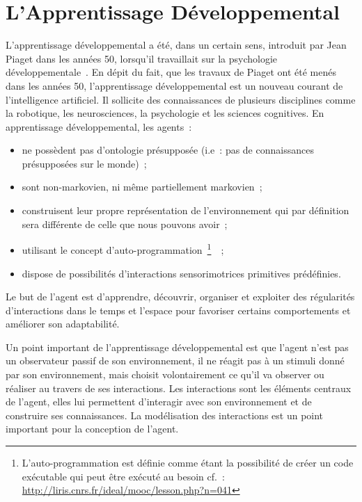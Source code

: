 \documentclass{llncs}
\begin{document}
\section{L'Apprentissage Développemental}
L'apprentissage développemental a été, dans un certain sens, introduit par Jean Piaget dans les années 50, lorsqu'il travaillait sur la psychologie développementale~\cite{cognitiviste-piaget1959construction}. En dépit du fait, que les travaux de Piaget ont été menés dans les années 50, l'apprentissage développemental est un nouveau courant de l'intelligence artificiel. Il sollicite des connaissances de plusieurs disciplines comme la robotique, les neurosciences, la psychologie et les sciences cognitives. 
En apprentissage développemental, les agents~:
\begin{itemize}
	\item ne possèdent pas d'ontologie présupposée (i.e~: pas de connaissances présupposées sur le monde)~;
	\item sont non-markovien, ni même partiellement markovien~;
	\item construisent leur propre représentation de l'environnement qui par définition sera différente de celle que nous pouvons avoir~;
	\item utilisant le concept d'auto-programmation~\footnote{L'auto-programmation est définie comme étant la possibilité de créer un code exécutable qui peut être exécuté au besoin cf.~: \url{http://liris.cnrs.fr/ideal/mooc/lesson.php?n=041}}~\cite{thorisson2013approaches}~;
	\item dispose de possibilités d'interactions sensorimotrices primitives prédéfinies.
\end{itemize}
Le but de l'agent est d'apprendre, découvrir, organiser et exploiter des régularités d'interactions dans le temps et l'espace pour favoriser certains  comportements et améliorer son adaptabilité.

Un point important de l'apprentissage développemental est que l'agent n'est pas un observateur passif de son environnement, il ne réagit pas à un stimuli donné par son environnement, mais choisit volontairement ce qu'il va observer ou réaliser au travers de ses interactions. 
Les interactions sont les éléments centraux de l'agent, elles lui permettent d'interagir avec son environnement et de construire ses connaissances. La modélisation des interactions est un point important pour la conception de l'agent. 
\end{document}
